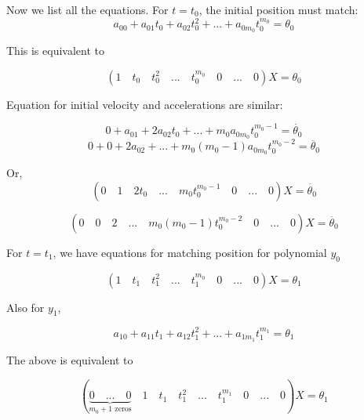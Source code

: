 \documentclass[a4paper]{article}
\begin{document}
  	Now we list all the equations. For $t=t_{0}$, the initial position must match:
  	\begin{equation*}
	  	a_{00}+a_{01}t_{0}+a_{02}t_{0}^{2}+...+a_{0m_{0}}t_{0}^{m_{0}}=\theta_{0}
  	\end{equation*}
  	
  	This is equivalent to 
  	
  	\begin{equation}
	  	(1 \quad t_{0} \quad t_{0}^{2} \quad ... \quad t_{0}^{m_{0}} \quad 0 \quad... \quad 0)X=\theta_{0}
  	\end{equation}
  	
  	Equation for initial velocity and accelerations are similar:
  	
  	\begin{equation*}
	  	0+a_{01}+2a_{02}t_{0}+...+m_{0} a_{0m_{0}} t_{0}^{m_{0}-1}=\dot{\theta_{0}}
  	\end{equation*}
  	\begin{equation*}
  		0+0+2a_{02}+...+m_{0} (m_{0}-1) a_{0m_{0}} t_{0}^{m_{0}-2}=\ddot{\theta_{0}}
  	\end{equation*}
  	
  	Or, 
  	\begin{equation}
  	(0 \quad 1 \quad 2t_{0} \quad ... \quad m_{0} t_{0}^{m_{0}-1} \quad 0 \quad... \quad 0)X=\dot{\theta_{0}}
  	\end{equation}
  	
  	\begin{equation}
  	(0 \quad 0 \quad 2 \quad ... \quad m_{0} (m_{0}-1) t_{0}^{m_{0}-2} \quad 0 \quad... \quad 0)X=\ddot{\theta_{0}}
  	\end{equation}
  	
  	For $t=t_{1}$, we have equations for matching position for polynomial $y_{0}$
  	
  	\begin{equation}
  	(1 \quad t_{1} \quad t_{1}^{2} \quad ... \quad t_{1}^{m_{0}} \quad 0 \quad... \quad 0)X=\theta_{1}
  	\end{equation}
  	
  	Also for $y_{1}$,
  	
  	\begin{equation*}
  	a_{10}+a_{11}t_{1}+a_{12}t_{1}^{2}+...+a_{1m_{1}}t_{1}^{m_{1}}=\theta_{1}
  	\end{equation*}
  	
  	The above is equivalent to
  	
  	\begin{equation}
  	(\underbrace{ 0 \quad ... \quad 0}_\text{$m_{0}+1$ zeros} \quad 1 \quad t_{1} \quad t_{1}^{2} \quad ... \quad t_{1}^{m_{1}} \quad 0 \quad... \quad 0)X=\theta_{1}
  	\end{equation}
  	
\end{document}

